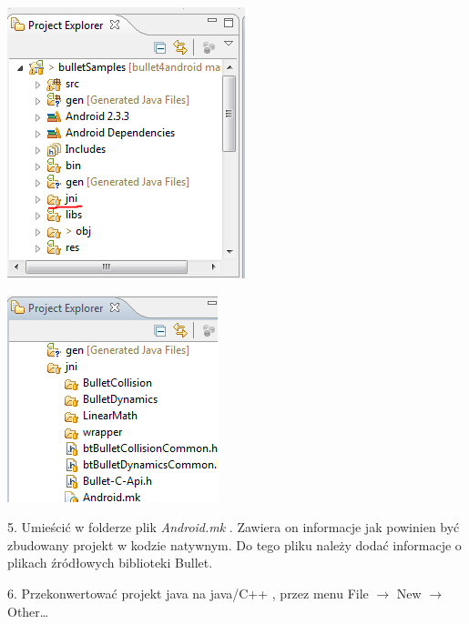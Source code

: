   \begin{center}
  \includegraphics{./img/jni-folder.png}
  
  \includegraphics{./img/bulletFoldery.png}
  \end{center}
  
  5. Umieścić w folderze plik \emph{Android.mk} . Zawiera on informacje jak
  powinien być zbudowany projekt w kodzie natywnym. Do tego pliku należy
  dodać informacje o plikach źródłowych biblioteki Bullet.
  
  
  6. Przekonwertować projekt java na java/C++ , przez menu File $ \rightarrow $
  New $ \rightarrow $ Other\ldots
  
